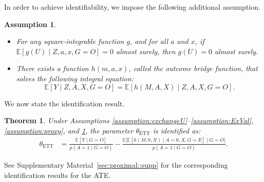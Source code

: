 \documentclass[10pt]{article}
\newtheorem{theorem}{Theorem}
\newtheorem{assumption}{Assumption}
\newcommand{\E}{\mathbb{E}}
\begin{document}
In order to achieve identifiability, we impose the following additional assumption.

\begin{assumption}
\label{assumption:compexist1}
~
\vspace{-3mm}
\begin{itemize}
    \item[(i)] For any square-integrable function \( g \), and for all \( a \) and \( x \), if \( \E[g(U) \mid Z, a, x, G=O] = 0 \) almost surely, then \( g(U) = 0 \) almost surely.
    
    \item[(ii)] There exists a function \( h(m,a,x) \), called the \emph{outcome bridge function}, that solves the following integral equation:
    \begin{equation}
    \label{eq:ORproxexisth}
    \E[Y \mid Z, A, X, G=O] = \E[h(M, A, X) \mid Z, A, X, G=O].
    \end{equation}
\end{itemize}
\end{assumption}

We now state the identification result.
\begin{theorem}
\label{thm:POR}
Under Assumptions \ref{assumption:exchangeU}--\ref{assumption:ExVal}, \ref{assumption:proxy}, and \ref{assumption:compexist1}, the parameter \( \theta_{\text{ETT}} \) is identified as:
\begin{align}\label{eq:POR}
\theta_{\text{ETT}}
&= \frac{\E[Y \mid G=O]}{p(A=1 \mid G=O)} -
\frac{\E\big[\E[h(M,0,X) \mid A=0, X, G=E] \mid G=O\big]}{p(A=1 \mid G=O)}.
\end{align}
\end{theorem}
See Supplementary Material~\ref{sec:proximal::supp} for the corresponding identification results for the ATE.
\end{document}
